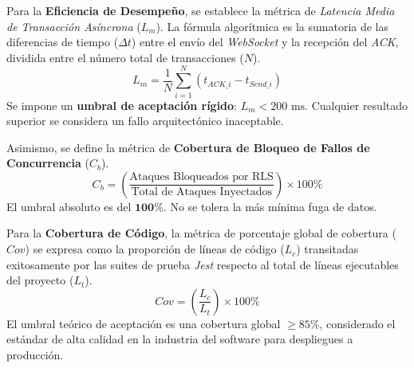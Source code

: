 Para la \textbf{Eficiencia de Desempe\~no}, se establece la m\'etrica de \textit{Latencia Media de Transacci\'on As\'incrona} ($L_m$). La f\'ormula algor\'itmica es la sumatoria de las diferencias de tiempo ($\Delta t$) entre el env\'io del \textit{WebSocket} y la recepci\'on del \textit{ACK}, dividida entre el n\'umero total de transacciones ($N$).
\begin{equation}
L_m = \frac{1}{N} \sum_{i=1}^{N} (t_{ACK\_i} - t_{Send\_i})
\end{equation}
Se impone un \textbf{umbral de aceptaci\'on r\'igido}: $L_m < 200 \text{ ms}$. Cualquier resultado superior se considera un fallo arquitect\'onico inaceptable.

Asimismo, se define la m\'etrica de \textbf{Cobertura de Bloqueo de Fallos de Concurrencia} ($C_b$).
\begin{equation}
C_b = \left( \frac{\text{Ataques Bloqueados por RLS}}{\text{Total de Ataques Inyectados}} \right) \times 100\%
\end{equation}
El umbral absoluto es del $\mathbf{100\%}$. No se tolera la m\'as m\'inima fuga de datos.

Para la \textbf{Cobertura de C\'odigo}, la m\'etrica de porcentaje global de cobertura ($Cov$) se expresa como la proporci\'on de l\'ineas de c\'odigo ($L_c$) transitadas exitosamente por las suites de prueba \textit{Jest} respecto al total de l\'ineas ejecutables del proyecto ($L_t$).
\begin{equation}
Cov = \left( \frac{L_c}{L_t} \right) \times 100\%
\end{equation}
El umbral te\'orico de aceptaci\'on es una cobertura global $\ge 85\%$, considerado el est\'andar de alta calidad en la industria del software para despliegues a producci\'on.
